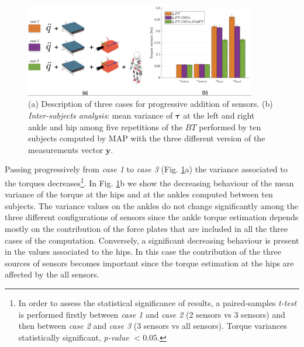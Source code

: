  \begin{figure}[!ht]
	 \centering
		\includegraphics[width=0.9\textwidth]{figs/sensAdditionAndBarAnalysis}
      \caption{(a) Description of three cases for progressive addition of sensors.
	   (b) \emph{Inter-subjects analysis}: mean variance of $\bm \tau$ at the left and right
	    ankle and hip among five repetitions of the $BT$ performed by ten subjects computed 
		by MAP with the three different version of the measurements vector $\bm y$.}
		 		\label{fig:sensAddition&barAnalysis}
 \end{figure}
% 
Passing progressively from \textit{case 1} to \textit{case 3} (Fig. \ref{fig:sensAddition&barAnalysis}a)
the variance associated to the torques decreases\footnote{In order to assess 
the statistical significance of results, a paired-samples
 \emph{t-test} is performed firstly between \textit{case 1} and \textit{case 2} 
 ($2$ sensors vs $3$ sensors) and then between \textit{case 2} and \textit{case 3} 
 ($3$ sensors vs all sensors).  Torque variances statistically significant,  
  \emph{p-value} $<0.05$.}. In Fig. \ref{fig:sensAddition&barAnalysis}b we show 
the decreasing behaviour of the mean variance of the torque at the hips and at the ankles
 computed between ten subjects.
%
The variance values on the ankles do not change significantly among the three different
 configurations of sensors since the ankle torque estimation depends mostly on the 
 contribution of the force plates that are included in all the three 
 cases of the computation.  Conversely, a significant decreasing behaviour is present 
 in the values associated to the hips. In this case the contribution of the three sources 
 of sensors becomes important since the torque estimation at the hips are affected 
 by the all sensors.